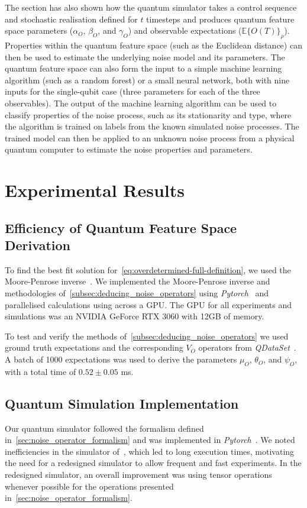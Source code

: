 \documentclass[12pt]{iopart}
\begin{document}
The section has also shown how the quantum simulator takes a control sequence and stochastic realisation defined for $t$ timesteps and produces quantum feature space parameters ($\alpha_O$, $\beta_O$, and $\gamma_O$) and observable expectations ($\mathbb{E}\{O(T)\}_\rho$). Properties within the quantum feature space (such as the Euclidean distance) can then be used to estimate the underlying noise model and its parameters. The quantum feature space can also form the input to a simple machine learning algorithm (such as a random forest) or a small neural network, both with nine inputs for the single-qubit case (three parameters for each of the three observables). The output of the machine learning algorithm can be used to classify properties of the noise process, such as its stationarity and type, where the algorithm is trained on labels from the known simulated noise processes. The trained model can then be applied to an unknown noise process from a physical quantum computer to estimate the noise properties and parameters.
\section{Experimental Results \label{sec:visulisation_of_noise_operator_parameters}}
\subsection{Efficiency of Quantum Feature Space Derivation \label{sec:quantum_feature_space_derivation_efficiency}}
To find the best fit solution for~\cref{eq:overdetermined-full-definition}, we used the Moore-Penrose inverse~\cite{penrose1955generalized}. We implemented the Moore-Penrose inverse and methodologies of~\cref{subsec:deducing_noise_operators} using \textit{Pytorch}~\cite{paszke2019pytorch} and parallelised calculations using across a GPU. The GPU for all experiments and simulations was an NVIDIA GeForce RTX 3060 with 12GB of memory.

To test and verify the methods of~\cref{subsec:deducing_noise_operators} we used ground truth expectations and the corresponding $V_O$ operators from \textit{QDataSet}~\cite{perrier2022qdataset}. A batch of 1000 expectations was used to derive the parameters $\mu_O$, $\theta_O$, and $\psi_O$, with a total time of $0.52 \pm 0.05$ ms.
\subsection{Quantum Simulation Implementation \label{subsec:quantum_simulation_implementation}}
Our quantum simulator followed the formalism defined in~\cref{sec:noise_operator_formalism} and was implemented in \textit{Pytorch}~\cite{paszke2019pytorch}. We noted inefficiencies in the simulator of~\cite{perrier2022qdataset}, which led to long execution times, motivating the need for a redesigned simulator to allow frequent and fast experiments. In the redesigned simulator, an overall improvement was using tensor operations whenever possible for the operations presented in~\cref{sec:noise_operator_formalism}. 
\end{document}
